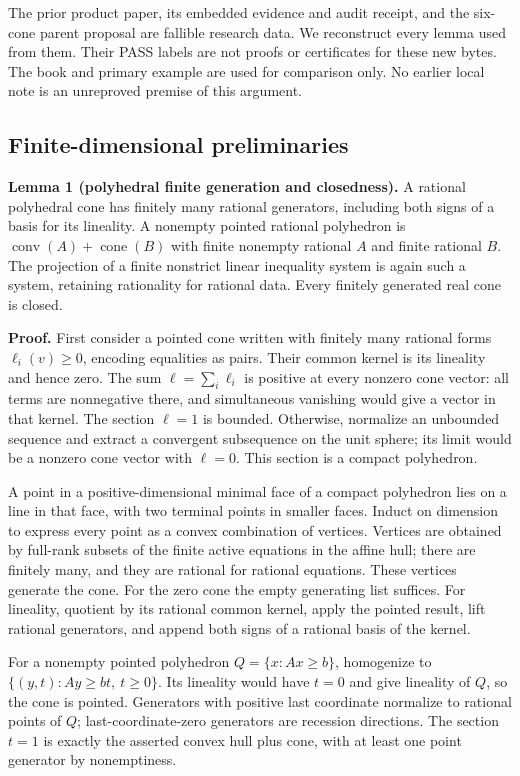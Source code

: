 \documentclass[
  10pt,
]{article}
\begin{document}
The prior product paper, its embedded evidence and audit receipt, and
the six-cone parent proposal are fallible research data. We reconstruct
every lemma used from them. Their PASS labels are not proofs or
certificates for these new bytes. The book and primary example are used
for comparison only. No earlier local note is an unreproved premise of
this argument.

\subsection{Finite-dimensional
preliminaries}\label{finite-dimensional-preliminaries}

\textbf{Lemma 1 (polyhedral finite generation and closedness).} A
rational polyhedral cone has finitely many rational generators,
including both signs of a basis for its lineality. A nonempty pointed
rational polyhedron is \(\operatorname{conv}(A)+\operatorname{cone}(B)\)
with finite nonempty rational \(A\) and finite rational \(B\). The
projection of a finite nonstrict linear inequality system is again such
a system, retaining rationality for rational data. Every finitely
generated real cone is closed.

\textbf{Proof.} First consider a pointed cone written with finitely many
rational forms \(\ell_i(v)\geq0\), encoding equalities as pairs. Their
common kernel is its lineality and hence zero. The sum
\(\ell=\sum_i\ell_i\) is positive at every nonzero cone vector: all
terms are nonnegative there, and simultaneous vanishing would give a
vector in that kernel. The section \(\ell=1\) is bounded. Otherwise,
normalize an unbounded sequence and extract a convergent subsequence on
the unit sphere; its limit would be a nonzero cone vector with
\(\ell=0\). This section is a compact polyhedron.

A point in a positive-dimensional minimal face of a compact polyhedron
lies on a line in that face, with two terminal points in smaller faces.
Induct on dimension to express every point as a convex combination of
vertices. Vertices are obtained by full-rank subsets of the finite
active equations in the affine hull; there are finitely many, and they
are rational for rational equations. These vertices generate the cone.
For the zero cone the empty generating list suffices. For lineality,
quotient by its rational common kernel, apply the pointed result, lift
rational generators, and append both signs of a rational basis of the
kernel.

For a nonempty pointed polyhedron \(Q=\{x:Ax\geq b\}\), homogenize to
\(\{(y,t):Ay\geq bt,\ t\geq0\}\). Its lineality would have \(t=0\) and
give lineality of \(Q\), so the cone is pointed. Generators with
positive last coordinate normalize to rational points of \(Q\);
last-coordinate-zero generators are recession directions. The section
\(t=1\) is exactly the asserted convex hull plus cone, with at least one
point generator by nonemptiness.
\end{document}
